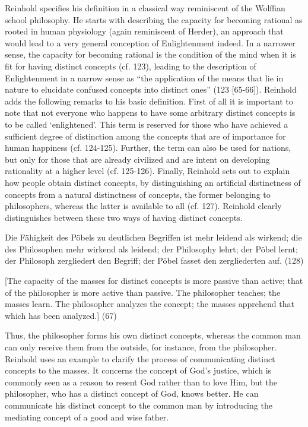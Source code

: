 Reinhold specifies his definition in a classical way reminiscent of the Wolffian school philosophy. He starts with describing the capacity for becoming rational as rooted in human physiology (again reminiscent of Herder), an approach that would lead to a very general conception of Enlightenment indeed. In a narrower sense, the capacity for becoming rational is the condition of the mind when it is fit for having distinct concepts (cf. 123), leading to the description of Enlightenment in a narrow sense as ``the application of the means that lie in nature to elucidate confused concepts into distinct ones'' (123 [65{-}66]). Reinhold adds the following remarks to his basic definition. First of all it is important to note that not everyone who happens to have some arbitrary distinct concepts is to be called `enlightened'. This term is reserved for those who have achieved a sufficient degree of distinction among the concepts that are of importance for human happiness (cf. 124{-}125). Further, the term can also be used for nations, but only for those that are already civilized and are intent on developing rationality at a higher level (cf. 125{-}126). Finally, Reinhold sets out to explain how people obtain distinct concepts, by distinguishing an artificial distinctness of concepts from a natural distinctness of concepts, the former belonging to philosophers, whereas the latter is available to all (cf. 127). Reinhold clearly distinguishes between these two ways of having distinct concepts.

Die F\"{a}higkeit des P\"{o}bels zu deutlichen Begriffen ist mehr leidend als wirkend; die des Philosophen mehr wirkend als leidend; der Philosophy lehrt; der P\"{o}bel lernt; der Philosoph zergliedert den Begriff; der P\"{o}bel fasset den zergliederten auf. (128)

[The capacity of the masses for distinct concepts is more passive than active; that of the philosopher is more active than passive. The philosopher teaches; the masses learn. The philosopher analyzes the concept; the masses apprehend that which has been analyzed.] (67)

Thus, the philosopher forms his own distinct concepts, whereas the common man can only receive them from the outside, for instance, from the philosopher. Reinhold uses an example to clarify the process of communicating distinct concepts to the masses. It concerns the concept of God's justice, which is commonly seen as a reason to resent God rather than to love Him, but the philosopher, who has a distinct concept of God, knows better. He can communicate his distinct concept to the common man by introducing the mediating concept of a good and wise father. 

